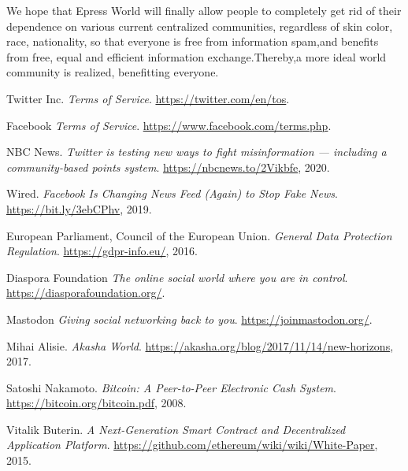 \documentclass{article}
\begin{document}
    We hope that Epress World will finally allow people to completely get rid of their dependence on various current centralized communities, regardless of skin color, race, nationality, so that everyone is free from information spam,and benefits from free, equal and efficient information exchange.Thereby,a more ideal world community is realized, benefitting everyone.
\begin{thebibliography}{9}

Twitter Inc.
\textit{Terms of Service}.
\url{https://twitter.com/en/tos}.

Facebook
\textit{Terms of Service}.
\url{https://www.facebook.com/terms.php}.

NBC News.
\textit{Twitter is testing new ways to fight misinformation — including a community-based points system}.
\url{https://nbcnews.to/2Vikbfe}, 2020.

Wired.
\textit{Facebook Is Changing News Feed (Again) to Stop Fake News}.
\url{https://bit.ly/3ebCPhv}, 2019.

European Parliament, Council of the European Union.
\textit{General Data Protection Regulation}.
\url{https://gdpr-info.eu/}, 2016.

Diaspora Foundation
\textit{The online social world where you are in control}.
\url{https://diasporafoundation.org/}.

Mastodon
\textit{Giving social networking back to you}.
\url{https://joinmastodon.org/}.

Mihai Alisie.
\textit{Akasha World}.
\url{https://akasha.org/blog/2017/11/14/new-horizons}, 2017.

Satoshi Nakamoto.
\textit{Bitcoin: A Peer-to-Peer Electronic Cash System}. 
\url{https://bitcoin.org/bitcoin.pdf}, 2008.

Vitalik Buterin.
\textit{A Next-Generation Smart Contract and Decentralized Application Platform}.
\url{https://github.com/ethereum/wiki/wiki/White-Paper}, 2015.

\end{thebibliography}
\end{document}
